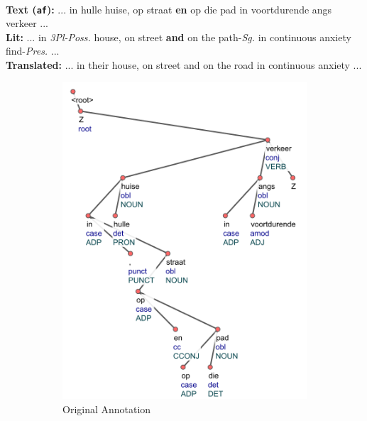 \begin{example}
\label{examp:nextConjHead-wrong}
\textbf{ }\\
\textbf{Text (\texttt{af}):} ... in hulle huise, op straat \textbf{en} op die pad in voortdurende angs verkeer ...\\
\textbf{Lit:} ... in \textit{3Pl-Poss.} house, on street \textbf{and} on the path-\textit{Sg.} in continuous anxiety find-\textit{Pres.} ...\\
\textbf{Translated:} ... in their house, on street and on the road in continuous anxiety ...
\end{example}

\begin{figure}[H]
    \begin{subfigure}{.49\textwidth}
     \includegraphics[scale=0.69]{img/nextConjHead-wrong1.png}
     \caption{Original Annotation}
    \end{subfigure}
    \begin{subfigure}{.5\textwidth}

\end{subfigure}
\end{figure}
